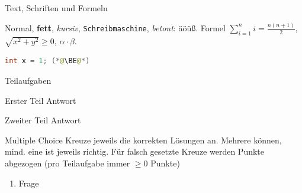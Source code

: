 \documentclass[a4paper]{article}
\begin{document}

\begin{Aufgabe}{Text, Schriften und Formeln}
\usepackage{amsmath} %
Normal, \textbf{fett}, \textit{kursiv}, \texttt{Schreibmaschine}, \emph{betont}: äöüß.
Formel $\sum_{i=1}^{n} i = \frac{n(n+1)}{2}$, $\sqrt{x^2 + y^2} \geq 0$, $\alpha \cdot \beta$.


\begin{LoesungCode}
\begin{lstlisting}[language=Java]
int x = 1; (*@\BE@*)
\end{lstlisting}
\end{LoesungCode}
\end{Aufgabe}

\begin{Aufgabe}{Teilaufgaben}
\begin{Teilaufgabe}{Erster Teil}
Antwort \BE \hBE
\end{Teilaufgabe}
\begin{Teilaufgabe}{Zweiter Teil}
Antwort \qBE
\end{Teilaufgabe}
\end{Aufgabe}

\begin{Aufgabe}{Multiple Choice} Kreuze jeweils die korrekten Lösungen an. Mehrere können, mind. eine ist jeweils richtig. Für falsch gesetzte Kreuze werden Punkte abgezogen (pro Teilaufgabe immer $\geq 0$ Punkte)

\begin{enumerate}[label=\alph*)]
\item {}
Frage
\end{enumerate}

\end{Aufgabe}
\end{document}
